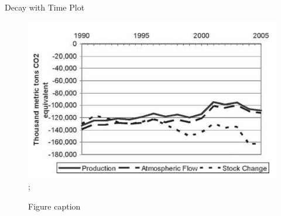 \documentclass[final]{beamer}\usepackage[]{graphicx}\usepackage[]{color}
\newlength{\onecolwid}
\newlength{\twocolwid}
\begin{document}
\begin{frame}[t]
\begin{columns}[t]
\begin{column}{\twocolwid}
\begin{columns}[t,totalwidth=\twocolwid]
\begin{column}{\onecolwid}

\end{column} %

\end{columns} %


\begin{alertblock}{Decay with Time Plot}
\begin{center}

\begin{figure}
    {\includegraphics{graph1.png}};
    \caption{Figure caption}
\end{figure}
\end{center}
\end{alertblock} 


\begin{columns}[t,totalwidth=\twocolwid] %

\begin{column}{\onecolwid} %



\end{column}
\end{columns}
\end{column}
\end{columns}
\end{frame}
\end{document}

